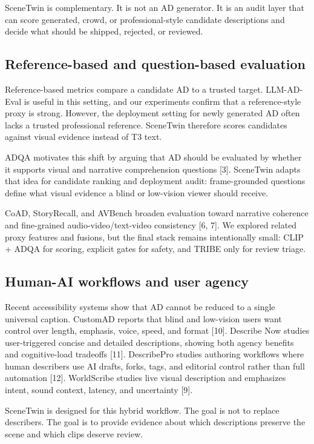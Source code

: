 \documentclass[10pt,twocolumn]{article}
\begin{document}
SceneTwin is complementary. It is not an AD generator. It is an audit layer that can score generated, crowd, or professional-style candidate descriptions and decide what should be shipped, rejected, or reviewed.


\subsection{Reference-based and question-based evaluation}

Reference-based metrics compare a candidate AD to a trusted target. LLM-AD-Eval is useful in this setting, and our experiments confirm that a reference-style proxy is strong. However, the deployment setting for newly generated AD often lacks a trusted professional reference. SceneTwin therefore scores candidates against visual evidence instead of T3 text.


ADQA motivates this shift by arguing that AD should be evaluated by whether it supports visual and narrative comprehension questions [3]. SceneTwin adapts that idea for candidate ranking and deployment audit: frame-grounded questions define what visual evidence a blind or low-vision viewer should receive.


CoAD, StoryRecall, and AVBench broaden evaluation toward narrative coherence and fine-grained audio-video/text-video consistency [6, 7]. We explored related proxy features and fusions, but the final stack remains intentionally small: CLIP + ADQA for scoring, explicit gates for safety, and TRIBE only for review triage.


\subsection{Human-AI workflows and user agency}

Recent accessibility systems show that AD cannot be reduced to a single universal caption. CustomAD reports that blind and low-vision users want control over length, emphasis, voice, speed, and format [10]. Describe Now studies user-triggered concise and detailed descriptions, showing both agency benefits and cognitive-load tradeoffs [11]. DescribePro studies authoring workflows where human describers use AI drafts, forks, tags, and editorial control rather than full automation [12]. WorldScribe studies live visual description and emphasizes intent, sound context, latency, and uncertainty [9].


SceneTwin is designed for this hybrid workflow. The goal is not to replace describers. The goal is to provide evidence about which descriptions preserve the scene and which clips deserve review.
\end{document}
